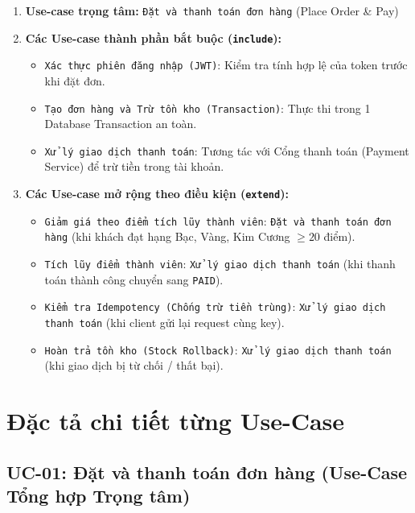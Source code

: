 \documentclass[12pt,a4paper]{article}
\begin{document}
\begin{tcolorbox}[colback=lightgray,colframe=brandblue,arc=2mm,title=\textbf{Cấu trúc quan hệ nghiệp vụ trong sơ đồ:}]
\small
\begin{enumerate}[leftmargin=*,itemsep=2pt]
    \item \textbf{Use-case trọng tâm:} \texttt{Đặt và thanh toán đơn hàng} (Place Order \& Pay)
    \item \textbf{Các Use-case thành phần bắt buộc (\texttt{include}):}
    \begin{itemize}[itemsep=1pt]
        \item \texttt{Xác thực phiên đăng nhập (JWT)}: Kiểm tra tính hợp lệ của token trước khi đặt đơn.
        \item \texttt{Tạo đơn hàng và Trừ tồn kho (Transaction)}: Thực thi trong 1 Database Transaction an toàn.
        \item \texttt{Xử lý giao dịch thanh toán}: Tương tác với Cổng thanh toán (Payment Service) để trừ tiền trong tài khoản.
    \end{itemize}
    \item \textbf{Các Use-case mở rộng theo điều kiện (\texttt{extend}):}
    \begin{itemize}[itemsep=1pt]
        \item \texttt{Giảm giá theo điểm tích lũy thành viên}: \texttt{Đặt và thanh toán đơn hàng} (khi khách đạt hạng Bạc, Vàng, Kim Cương $\ge 20$ điểm).
        \item \texttt{Tích lũy điểm thành viên}: \texttt{Xử lý giao dịch thanh toán} (khi thanh toán thành công chuyển sang \texttt{PAID}).
        \item \texttt{Kiểm tra Idempotency (Chống trừ tiền trùng)}: \texttt{Xử lý giao dịch thanh toán} (khi client gửi lại request cùng key).
        \item \texttt{Hoàn trả tồn kho (Stock Rollback)}: \texttt{Xử lý giao dịch thanh toán} (khi giao dịch bị từ chối / thất bại).
    \end{itemize}
\end{enumerate}
\end{tcolorbox}

\clearpage
\section{Đặc tả chi tiết từng Use-Case}

\subsection{UC-01: Đặt và thanh toán đơn hàng (Use-Case Tổng hợp Trọng tâm)}
\end{document}
